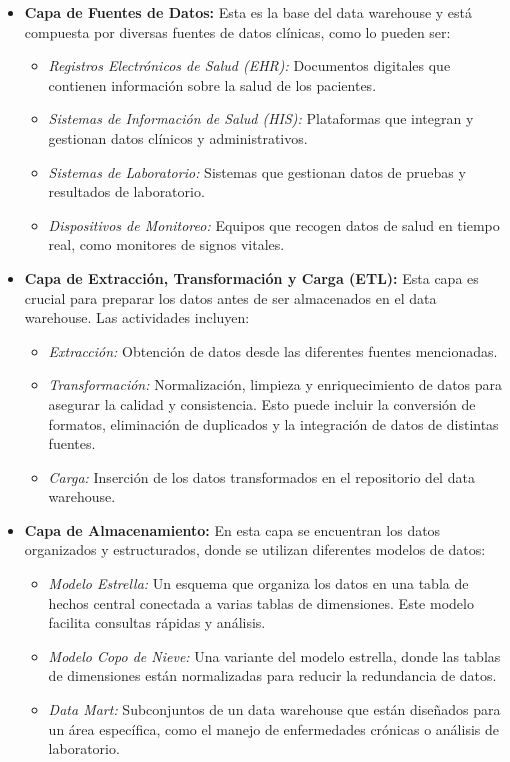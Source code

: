 \documentclass[12pt, a4paper, twoside]{article}
\begin{document}
	\begin{itemize}
		\item \textbf{Capa de Fuentes de Datos:} Esta es la base del data warehouse y está compuesta por diversas fuentes de datos clínicas, como lo pueden ser:
		\begin{itemize}
			\item \textit{Registros Electrónicos de Salud (EHR):} Documentos digitales que contienen información sobre la salud de los pacientes.
			\item \textit{Sistemas de Información de Salud (HIS):} Plataformas que integran y gestionan datos clínicos y administrativos.
			\item \textit{Sistemas de Laboratorio:} Sistemas que gestionan datos de pruebas y resultados de laboratorio.
			\item \textit{Dispositivos de Monitoreo:} Equipos que recogen datos de salud en tiempo real, como monitores de signos vitales.
		\end{itemize}
		
		\item \textbf{Capa de Extracción, Transformación y Carga (ETL):} Esta capa es crucial para preparar los datos antes de ser almacenados en el data warehouse. Las actividades incluyen:
		\begin{itemize}
			\item \textit{Extracción:} Obtención de datos desde las diferentes fuentes mencionadas.
			\item \textit{Transformación:} Normalización, limpieza y enriquecimiento de datos para asegurar la calidad y consistencia. Esto puede incluir la conversión de formatos, eliminación de duplicados y la integración de datos de distintas fuentes.
			\item \textit{Carga:} Inserción de los datos transformados en el repositorio del data warehouse.
		\end{itemize}
		
		\item \textbf{Capa de Almacenamiento:} En esta capa se encuentran los datos organizados y estructurados, donde se utilizan diferentes modelos de datos:
		\begin{itemize}
			\item \textit{Modelo Estrella:} Un esquema que organiza los datos en una tabla de hechos central conectada a varias tablas de dimensiones. Este modelo facilita consultas rápidas y análisis.
			\item \textit{Modelo Copo de Nieve:} Una variante del modelo estrella, donde las tablas de dimensiones están normalizadas para reducir la redundancia de datos.
			\item \textit{Data Mart:} Subconjuntos de un data warehouse que están diseñados para un área específica, como el manejo de enfermedades crónicas o análisis de laboratorio.
		\end{itemize}
		

\end{itemize}
\end{document}
